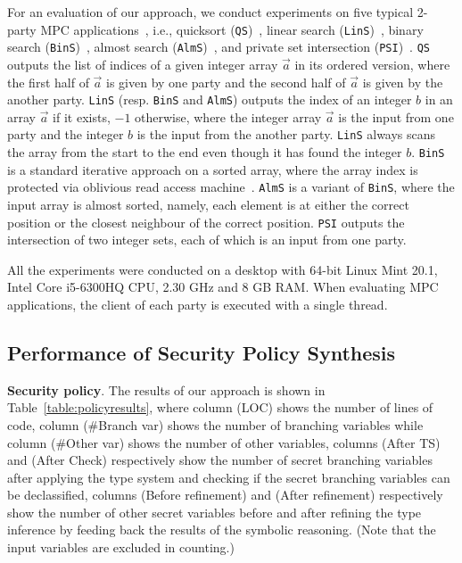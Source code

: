 %
For an evaluation of our approach, we conduct experiments on five typical 2-party MPC applications~\cite{benchmarks}, i.e.,
quicksort ({\tt QS})~\cite{mpcqsort}, linear search ({\tt LinS})~\cite{absent}, binary search  ({\tt BinS})~\cite{absent},
  almost search ({\tt AlmS})~\cite{Knuth73},
and  private set intersection  ({\tt PSI})~\cite{Andreea21}.
{\tt QS} outputs the list of indices of a given integer array $\vec{a}$ in its ordered version, where
the first half of $\vec{a}$ is given by one party and the second half of $\vec{a}$ is given by the another party.
{\tt LinS} (resp. {\tt BinS} and {\tt AlmS}) outputs the index
of an integer $b$ in an array $\vec{a}$ if it exists, $-1$ otherwise, where
the integer array $\vec{a}$ is the input from one party and the integer $b$ is the input from
the another party.
{\tt LinS} always scans the array from the start to the end even though it has found the integer $b$.
{\tt BinS} is a standard iterative approach on a sorted array, where the array index is protected via oblivious read access machine~\cite{GoldreichO96}.
{\tt AlmS} is a variant of {\tt BinS}, where the input array is almost sorted, namely,
each element is at either the correct position or the closest neighbour
of the correct position.
{\tt PSI} outputs the intersection of two integer sets, each of which
is an input from one party.

All the experiments were conducted on a desktop with 64-bit Linux Mint 20.1, Intel Core i5-6300HQ CPU, 2.30 GHz and 8 GB RAM. When evaluating MPC applications, the client of each party
is executed with a single thread.


\subsection{Performance of Security Policy Synthesis}
{\bf Security policy}.
The results of our approach is shown in Table~\ref{table:policyresults},
where column (LOC) shows the number of lines of code,
column (\#Branch var) shows the number of branching variables
while column (\#Other var) shows the number of other variables,
columns (After TS) and (After Check) respectively
show the number of secret branching variables after
applying the type system and checking if the secret branching variables can be declassified,
columns (Before refinement) and (After refinement) respectively show
the number of other secret variables before and after refining the type inference by feeding
back the results of the symbolic reasoning.
(Note that the input variables are excluded in counting.)

